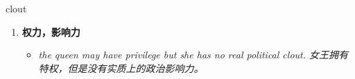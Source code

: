 
\begin{frame}
{\huge clout}
\begin{center}
\begin{enumerate}\Large
  \item \textbf{权力，影响力}
  \begin{itemize}
    \item \em{\Large{the queen may have privilege but she has no real political clout. 女王拥有特权，但是没有实质上的政治影响力。}}
  \end{itemize}
\end{enumerate}
\end{center}
\end{frame}
